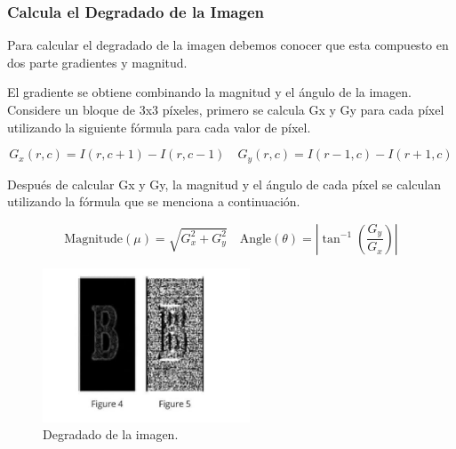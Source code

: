 \subsubsection{Calcula el Degradado de la Imagen}
Para calcular el degradado de la imagen debemos conocer que esta compuesto en dos parte gradientes y magnitud.

El gradiente se obtiene combinando la magnitud y el ángulo de la imagen. Considere un bloque de 3x3 píxeles, primero se calcula Gx y Gy para cada píxel utilizando la siguiente fórmula para cada valor de píxel.

\[
G_x(r,c) = I(r,c+1) - I(r,c-1) \quad G_y(r,c) = I(r-1,c) - I(r+1,c)
\]


Después de calcular Gx y Gy, la magnitud y el ángulo de cada píxel se calculan utilizando la fórmula que se menciona a continuación.

\[
\text{Magnitude}(\mu) = \sqrt{G_x^2 + G_y^2} \quad \text{Angle}(\theta) = \left| \tan^{-1}\left(\frac{G_y}{G_x}\right) \right|
\]

\begin{figure}[H]
    \centering
    \includegraphics[width=0.55\textwidth]{2/2_teoria/figures/Hog2.jpeg} %
    \caption{Degradado de la imagen.}
    \label{fig:etiqueta_imagen} %
\end{figure}

